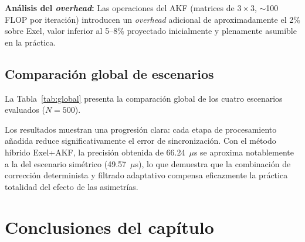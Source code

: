 \textbf{Análisis del \textit{overhead}:} Las operaciones del AKF (matrices de $3 \times 3$, $\sim$100 FLOP por iteración) introducen un \textit{overhead} adicional de aproximadamente el 2\% sobre Exel, valor inferior al 5--8\% proyectado inicialmente y plenamente asumible en la práctica.

\subsection{Comparación global de escenarios}
\label{sec:3.2.3}

La Tabla~\ref{tab:global} presenta la comparación global de los cuatro escenarios evaluados ($N = 500$).



Los resultados muestran una progresión clara: cada etapa de procesamiento añadida reduce significativamente el error de sincronización. Con el método híbrido Exel+AKF, la precisión obtenida de 66.24~$\mu$s se aproxima notablemente a la del escenario simétrico (49.57~$\mu$s), lo que demuestra que la combinación de corrección determinista y filtrado adaptativo compensa eficazmente la práctica totalidad del efecto de las asimetrías.

\section{Conclusiones del capítulo}
\label{sec:3.3}

